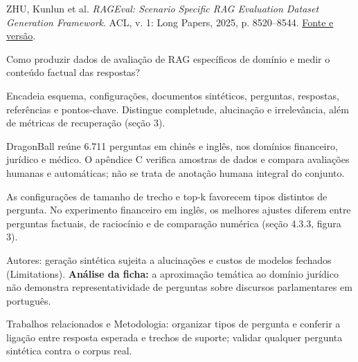 {\small ZHU, Kunlun et al. \textit{RAGEval: Scenario Specific RAG Evaluation Dataset Generation Framework}. ACL, v. 1: Long Papers, 2025, p. 8520--8544. \href{https://aclanthology.org/2025.acl-long.418/}{Fonte e versão}.\par}

Como produzir dados de avaliação de RAG específicos de domínio e medir o conteúdo factual das respostas?

Encadeia esquema, configurações, documentos sintéticos, perguntas, respostas, referências e pontos-chave. Distingue completude, alucinação e irrelevância, além de métricas de recuperação (seção 3).

DragonBall reúne 6.711 perguntas em chinês e inglês, nos domínios financeiro, jurídico e médico. O apêndice C verifica amostras de dados e compara avaliações humanas e automáticas; não se trata de anotação humana integral do conjunto.

As configurações de tamanho de trecho e top-k favorecem tipos distintos de pergunta. No experimento financeiro em inglês, os melhores ajustes diferem entre perguntas factuais, de raciocínio e de comparação numérica (seção 4.3.3, figura 3).

\begin{itemize}
\end{itemize}

Autores: geração sintética sujeita a alucinações e custos de modelos fechados (Limitations). \textbf{Análise da ficha:} a aproximação temática ao domínio jurídico não demonstra representatividade de perguntas sobre discursos parlamentares em português.

Trabalhos relacionados e Metodologia: organizar tipos de pergunta e conferir a ligação entre resposta esperada e trechos de suporte; validar qualquer pergunta sintética contra o corpus real.

